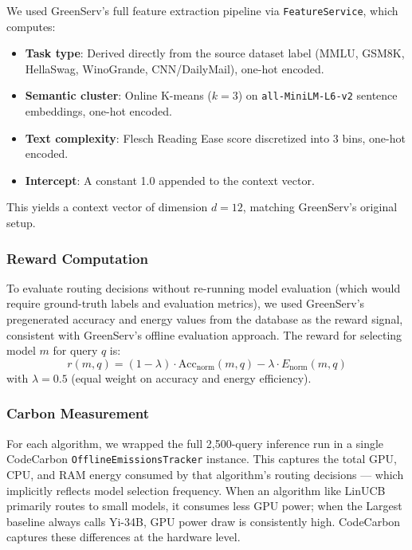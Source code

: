 \documentclass[12pt]{article}
\begin{document}
We used GreenServ's full feature extraction pipeline via
\texttt{FeatureService}, which computes:
\begin{itemize}
  \item \textbf{Task type}: Derived directly from the source dataset label
  (MMLU, GSM8K, HellaSwag, WinoGrande, CNN/DailyMail), one-hot encoded.
  \item \textbf{Semantic cluster}: Online K-means ($k=3$) on
  \texttt{all-MiniLM-L6-v2} sentence embeddings, one-hot encoded.
  \item \textbf{Text complexity}: Flesch Reading Ease score discretized
  into 3 bins, one-hot encoded.
  \item \textbf{Intercept}: A constant 1.0 appended to the context vector.
\end{itemize}
This yields a context vector of dimension $d = 12$, matching GreenServ's
original setup.

\subsubsection{Reward Computation}

To evaluate routing decisions without re-running model evaluation (which
would require ground-truth labels and evaluation metrics), we used
GreenServ's pregenerated accuracy and energy values from the database as the
reward signal, consistent with GreenServ's offline evaluation approach. The
reward for selecting model $m$ for query $q$ is:
\begin{equation}
r(m, q) = (1 - \lambda) \cdot \text{Acc}_\text{norm}(m, q) - \lambda \cdot E_\text{norm}(m, q)
\end{equation}
with $\lambda = 0.5$ (equal weight on accuracy and energy efficiency).

\subsubsection{Carbon Measurement}

For each algorithm, we wrapped the full 2,500-query inference run in a
single CodeCarbon \texttt{OfflineEmissionsTracker} instance. This captures
the total GPU, CPU, and RAM energy consumed by that algorithm's routing
decisions --- which implicitly reflects model selection frequency. When an
algorithm like LinUCB primarily routes to small models, it consumes less GPU
power; when the Largest baseline always calls Yi-34B, GPU power draw is
consistently high. CodeCarbon captures these differences at the hardware
level.
\end{document}
